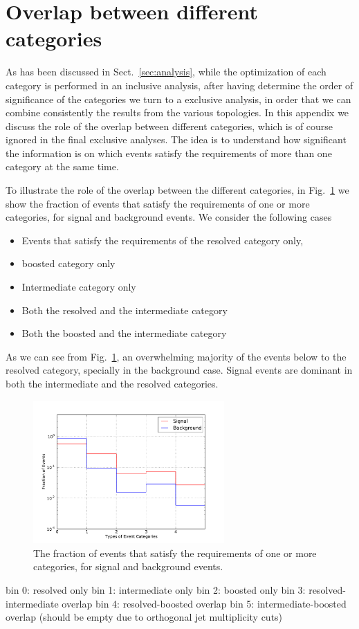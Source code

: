 
\section{Overlap between different categories}
\label{sec:overlap}

As has been discussed in Sect.~\ref{sec:analysis}, while the optimization of each
category is performed in an inclusive analysis, after having determine the order
of significance of the categories we turn to a exclusive analysis, in order that
we can combine consistently the results from the various topologies.
%
In this appendix we discuss the role of the overlap
between  different categories, which is of course ignored in the final exclusive
analyses.
%
The idea is to understand how significant the information is on which events satisfy the requirements
of more than one category at the same time.

To illustrate the role of the overlap between the different categories, in
Fig.~\ref{fig:categorisationHisto} we show the fraction of events that satisfy the requirements
of one or more categories, for signal and background events.
%
We consider the following cases
\begin{itemize}
\item Events that satisfy the requirements of the resolved category only,
\item boosted category only
\item Intermediate category only
\item Both the resolved and the intermediate category
  \item Both the boosted and the intermediate category
\end{itemize}
As we can see from Fig.~\ref{fig:categorisationHisto}, an overwhelming majority of the events
below to the resolved category, specially in the background case.
%
Signal events are dominant in both the intermediate and the resolved categories.

\begin{figure}[t]
\begin{center}
\includegraphics[width=0.65\textwidth]{plots/overlap_categories_C1.pdf}
\caption{\small The fraction of events that satisfy the requirements
  of one or more categories, for signal and background events.
}
\label{fig:categorisationHisto}
\end{center}
\end{figure}

bin 0: resolved only
bin 1: intermediate only
bin 2: boosted only
bin 3: resolved-intermediate overlap
bin 4: resolved-boosted overlap
bin 5: intermediate-boosted overlap (should be empty due to orthogonal jet multiplicity cuts) 
